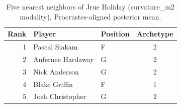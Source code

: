 \begin{table}[htbp]
  \centering\small
  \begin{tabular}{rllc}
    \toprule
    Rank & Player & Position & Archetype \\
    \midrule
    1 & Pascal Siakam & F & 2 \\
    2 & Anfernee Hardaway & G & 2 \\
    3 & Nick Anderson & G & 2 \\
    4 & Blake Griffin & F & 1 \\
    5 & Josh Christopher & G & 2 \\
    \bottomrule
  \end{tabular}
  \caption{Five nearest neighbors of Jrue Holiday (curvature_m2 modality), Procrustes-aligned posterior mean.}
  \label{tab:Jrue_Holiday_neighbors_curvature_m2}
\end{table}

